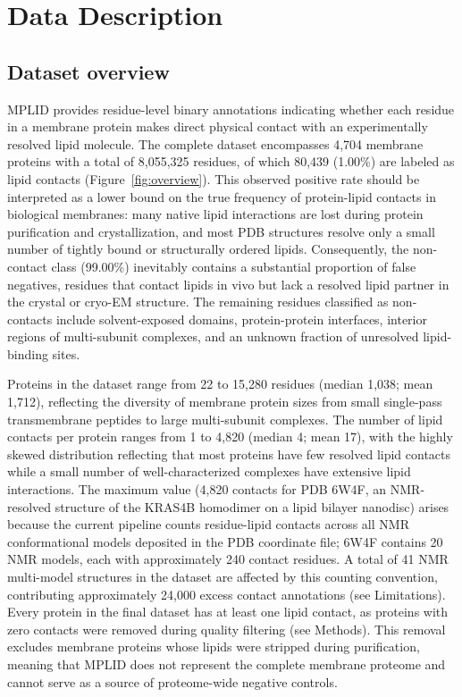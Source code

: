 \documentclass[unnumsec,webpdf,contemporary,large]{oup-authoring-template}
\begin{document}
\section{Data Description}

\subsection{Dataset overview}

MPLID provides residue-level binary annotations indicating whether each residue in a membrane protein makes direct physical contact with an experimentally resolved lipid molecule. The complete dataset encompasses 4,704 membrane proteins with a total of 8,055,325 residues, of which 80,439 (1.00\%) are labeled as lipid contacts (Figure~\ref{fig:overview}). This observed positive rate should be interpreted as a lower bound on the true frequency of protein-lipid contacts in biological membranes: many native lipid interactions are lost during protein purification and crystallization, and most PDB structures resolve only a small number of tightly bound or structurally ordered lipids. Consequently, the non-contact class (99.00\%) inevitably contains a substantial proportion of false negatives, residues that contact lipids in vivo but lack a resolved lipid partner in the crystal or cryo-EM structure. The remaining residues classified as non-contacts include solvent-exposed domains, protein-protein interfaces, interior regions of multi-subunit complexes, and an unknown fraction of unresolved lipid-binding sites.

Proteins in the dataset range from 22 to 15,280 residues (median 1,038; mean 1,712), reflecting the diversity of membrane protein sizes from small single-pass transmembrane peptides to large multi-subunit complexes. The number of lipid contacts per protein ranges from 1 to 4,820 (median 4; mean 17), with the highly skewed distribution reflecting that most proteins have few resolved lipid contacts while a small number of well-characterized complexes have extensive lipid interactions. The maximum value (4,820 contacts for PDB 6W4F, an NMR-resolved structure of the KRAS4B homodimer on a lipid bilayer nanodisc) arises because the current pipeline counts residue-lipid contacts across all NMR conformational models deposited in the PDB coordinate file; 6W4F contains 20 NMR models, each with approximately 240 contact residues. A total of 41 NMR multi-model structures in the dataset are affected by this counting convention, contributing approximately 24,000 excess contact annotations (see Limitations). Every protein in the final dataset has at least one lipid contact, as proteins with zero contacts were removed during quality filtering (see Methods). This removal excludes membrane proteins whose lipids were stripped during purification, meaning that MPLID does not represent the complete membrane proteome and cannot serve as a source of proteome-wide negative controls.
\end{document}
